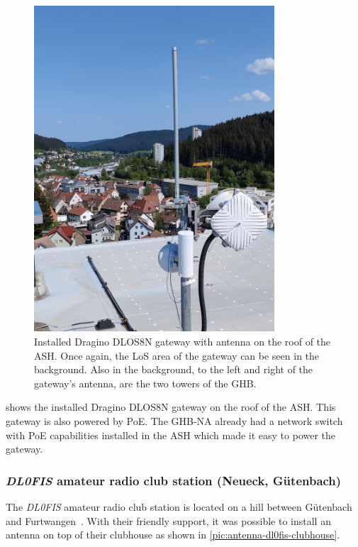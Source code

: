 \begin{figure}
    \centering
    \includegraphics[width=0.8\textwidth]{pictures/hardware/gateway-deployment/gateway_ash.jpg}
    \caption{
        Installed Dragino DLOS8N gateway with antenna on the roof of the \ac{ASH}.
        Once again, the \ac{LoS} area of the gateway can be seen in the background.
        Also in the background, to the left and right of the gateway's antenna, are the two towers of the \ac{GHB}.
    }\label{pic:dragino-gateway-ash}
\end{figure}

 shows the installed Dragino DLOS8N gateway on the roof of the \ac{ASH}.
This gateway is also powered by \ac{PoE}.
The \acl{GHB-NA} already had a network switch with \ac{PoE} capabilities installed in the \ac{ASH} which made it easy to power the gateway.

\subsubsection{\emph{DL0FIS} amateur radio club station (Neueck, Gütenbach)}

The \emph{DL0FIS} amateur radio club station is located on a hill between Gütenbach and Furtwangen~\cite{dl0fis_clubstation_2023}.
With their friendly support, it was possible to install an antenna on top of their clubhouse as shown in \cref{pic:antenna-dl0fis-clubhouse}.

